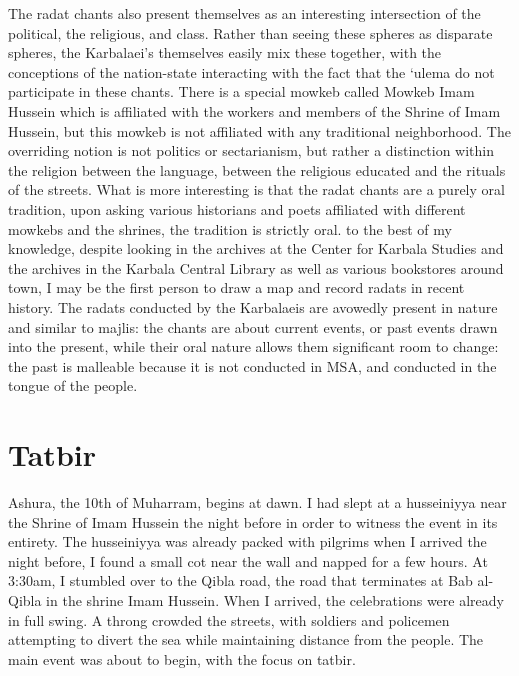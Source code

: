 The radat chants also present themselves as an interesting intersection of the political, the religious, and class. Rather than seeing these spheres as disparate spheres, the Karbalaei’s themselves easily mix these together, with the conceptions of the nation-state interacting with the fact that the ‘ulema do not participate in these chants. There is a special mowkeb called Mowkeb Imam Hussein which is affiliated with the workers and members of the Shrine of Imam Hussein, but this mowkeb is not affiliated with any traditional neighborhood. The overriding notion is not politics or sectarianism, but rather a distinction within the religion between the language, between the religious educated and the rituals of the streets. What is more interesting is that the radat chants are a purely oral tradition, upon asking various historians and poets affiliated with different mowkebs and the shrines, the tradition is strictly oral. to the best of my knowledge, despite looking in the archives at the Center for Karbala Studies and the archives in the Karbala Central Library as well as various bookstores around town, I may be the first person to draw a map and record radats in recent history. The radats conducted by the Karbalaeis are avowedly present in nature and similar to majlis: the chants are about current events, or past events drawn into the present, while their oral nature allows them significant room to change: the past is malleable because it is not conducted in MSA, and conducted in the tongue of the people. 

\section{Tatbir}
Ashura, the 10th of Muharram, begins at dawn. I had slept at a husseiniyya near the Shrine of Imam Hussein the night before in order to witness the event in its entirety. The husseiniyya was already packed with pilgrims when I arrived the night before, I found a small cot near the wall and napped for a few hours. At 3:30am, I stumbled over to the Qibla road, the road that terminates at Bab al-Qibla in the shrine Imam Hussein. When I arrived, the celebrations were already in full swing. A throng crowded the streets, with soldiers and policemen attempting to divert the sea while maintaining distance from the people. The main event was about to begin, with the focus on tatbir. 

